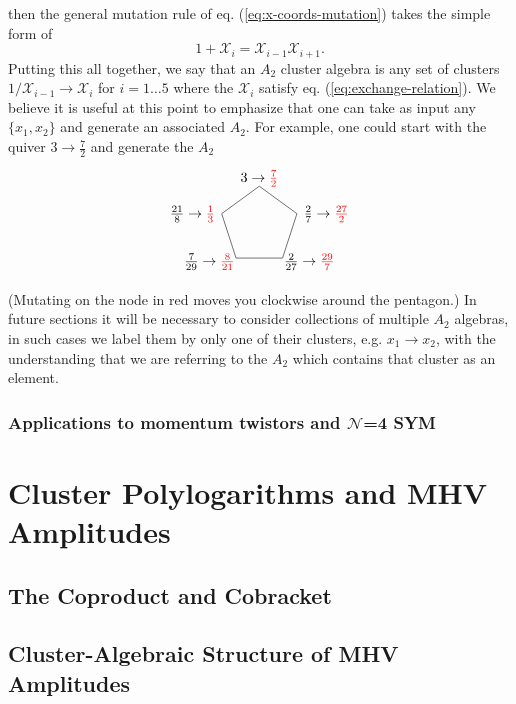 \documentclass[11pt]{article}
\def\x{\mathcal{X}}
\def\pdfeq#1{\texorpdfstring{$#1$}{a}}
\def\drawPentagon{
\coordinate (P1) at (90:1);
\coordinate (P2) at (18:1);
\coordinate (P3) at (306:1);
\coordinate (P4) at (234:1);
\coordinate (P5) at (162:1);
\draw (P1) -- (P2) -- (P3) -- (P4) -- (P5) -- cycle;
}
\begin{document}
then the general mutation rule of eq. (\ref{eq:x-coords-mutation}) takes the simple form of
\begin{equation}\label{eq:exchange-relation}
  1+\x_i = \x_{i-1}\x_{i+1}.
\end{equation}
Putting this all together, we say that an $A_2$ cluster algebra is any set of clusters $1/\x_{i-1} \to \x_i$ for $i=1\ldots5$ where the $\x_i$ satisfy eq. (\ref{eq:exchange-relation}). We believe it is useful at this point to emphasize that one can take as input any $\{x_1, x_2\}$ and generate an associated $A_2$. For example, one could start with the quiver $3\to\frac{7}{2}$ and generate the $A_2$
\begin{equation}
\begin{tikzpicture}
  \drawPentagon
  \draw (0,1.2) node {$3\to\color{red}{\frac{7}{2}}$};
  \draw (1,.3) node[anchor=west] {$\frac{2}{7} \to \color{red}{\frac{27}{2}} $};
  \draw (.5,-.9) node[anchor=west] {$\frac{2}{27} \to \color{red}{\frac{29}{7}}$};
  \draw (-.5,-.9) node[anchor=east] {$\frac{7}{29} \to \color{red}{\frac{8}{21}}$};
  \draw (-1,.3) node[anchor=east] {$\frac{21}{8} \to \color{red}{\frac{1}{3}}$};
\end{tikzpicture}
\end{equation}
(Mutating on the node in red moves you clockwise around the pentagon.) In future sections it will be necessary to consider collections of multiple $A_2$ algebras, in such cases we label them by only one of their clusters, e.g. $x_1 \to x_2$, with the understanding that we are referring to the $A_2$ which contains that cluster as an element. 

\subsubsection{Applications to momentum twistors and \pdfeq{\mathcal{N}}=4 SYM}

\section{Cluster Polylogarithms and MHV Amplitudes}

\subsection{The Coproduct and Cobracket}

\subsection{Cluster-Algebraic Structure of MHV Amplitudes}
\end{document}
